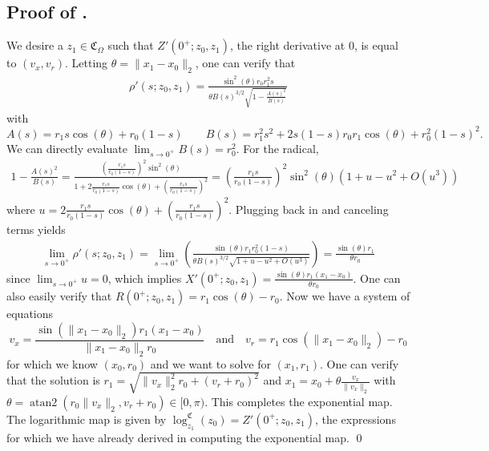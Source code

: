 \documentclass[11pt]{article}
\begin{document}
\subsection{Proof of .} \label{sec: proof of cone exponential and log map}

We desire a $z_1 \in \mathfrak{C}_\Omega$ such that $Z'(0^+; z_0, z_1)$, the right derivative at $0$, is equal to $(v_x, v_r).$ Letting $\theta = \|x_1 - x_0\|_2$, one can verify that 
\begin{align*}
    \rho'(s; z_0, z_1) = \frac{\sin^2(\theta)r_0r_1^2s}{\theta B(s)^{3/2}\sqrt{1 - \frac{A(s)^2}{B(s)}}}
\end{align*}
with 
\begin{equation*}
    A(s) = r_1s\cos(\theta) + r_0(1-s) \qquad B(s) = r_1^2s^2 + 2s(1-s)r_0r_1\cos(\theta) + r_0^2(1-s)^2.
\end{equation*}
We can directly evaluate $\lim_{s \rightarrow 0^+}B(s) = r_0^2$. For the radical,
\begin{align*}
    1 - \frac{A(s)^2}{B(s)} = \frac{\left(\frac{r_1s}{r_0(1-s)}\right)^2\sin^2(\theta)}{1 + 2\frac{r_1s}{r_0(1-s)}\cos(\theta) + \left(\frac{r_1s}{r_0(1-s)}\right)^2} = \left(\frac{r_1s}{r_0(1-s)}\right)^2\sin^2(\theta)\left(1 + u - u^2 + O(u^3)\right)
\end{align*}
where $u = 2\frac{r_1s}{r_0(1-s)}\cos(\theta) + \left(\frac{r_1s}{r_0(1-s)}\right)^2$. Plugging back in and canceling terms yields
\begin{align*}
    \lim_{s \rightarrow 0^+}\rho'(s; z_0, z_1) = \lim_{s\rightarrow 0^+}\left(\frac{\sin(\theta)r_1r_0^2(1-s)}{\theta B(s)^{3/2}\sqrt{1  + u - u^2 + O(u^3)}}\right) = \frac{\sin(\theta)r_1}{\theta r_0}
\end{align*}
since $\lim_{s \rightarrow 0^+}u = 0$, which implies $X'(0^+; z_0, z_1) = \frac{\sin(\theta)r_1(x_1 - x_0)}{\theta r_0}$. One can also easily verify that $R(0^+; z_0, z_1) = r_1\cos(\theta) - r_0$. Now we have a system of equations 
\begin{equation*}
    v_x = \frac{\sin(\|x_1 - x_0\|_2)r_1(x_1 - x_0)}{\|x_1 - x_0\|_2 r_0} \quad \text{and} \quad  v_r = r_1\cos(\|x_1 - x_0\|_2) - r_0
\end{equation*}
for which we know $(x_0, r_0)$ and we want to solve for $(x_1, r_1)$. One can verify that the solution is $r_1 = \sqrt{\|v_x\|_2^2r_0 + (v_r+r_0)^2}$ and $x_1 = x_0 + \theta\frac{v_x}{\|v_x\|_2}$ with $\theta = \operatorname{atan2}(r_0\|v_x\|_2, v_r + r_0) \in [0, \pi)$. This completes the exponential map. The logarithmic map is given by
$\log^{\mathfrak{C}}_{z_1}(z_0) = Z'(0^+; z_0, z_1)$, the expressions for which we have already derived in computing the exponential map.
\qed{}
\end{document}
